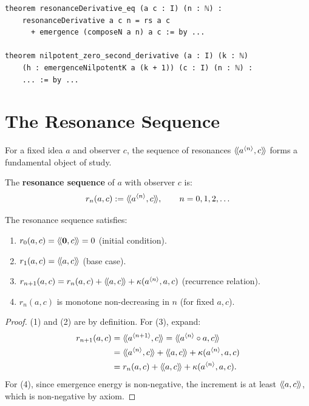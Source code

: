 \begin{lstlisting}[caption={Resonance derivative (IDT\_v3\_Emergence.lean)}]
theorem resonanceDerivative_eq (a c : I) (n : ℕ) :
    resonanceDerivative a c n = rs a c
      + emergence (composeN a n) a c := by ...

theorem nilpotent_zero_second_derivative (a : I) (k : ℕ)
    (h : emergenceNilpotentK a (k + 1)) (c : I) (n : ℕ) :
    ... := by ...
\end{lstlisting}


\section{The Resonance Sequence}

For a fixed idea $a$ and observer $c$, the sequence of resonances $\langle\!\langle a^{\langle n \rangle}, c \rangle\!\rangle$
forms a fundamental object of study.

\begin{definition}
\label{def:resonance-seq}
The \textbf{resonance sequence} of $a$ with observer $c$ is:
\[
  r_n(a,c) := \langle\!\langle a^{\langle n \rangle}, c \rangle\!\rangle, \qquad n = 0, 1, 2, \ldots
\]
\end{definition}

\begin{theorem}
\label{thm:resonance-seq-properties}
The resonance sequence satisfies:
\begin{enumerate}
  \item $r_0(a,c) = \langle\!\langle \mathbf{0}, c \rangle\!\rangle = 0$ (initial condition).
  \item $r_1(a,c) = \langle\!\langle a, c \rangle\!\rangle$ (base case).
  \item $r_{n+1}(a,c) = r_n(a,c) + \langle\!\langle a, c \rangle\!\rangle + \kappa(a^{\langle n \rangle}, a, c)$
    (recurrence relation).
  \item $r_n(a,c)$ is monotone non-decreasing in $n$ (for fixed $a, c$).
\end{enumerate}
\end{theorem}

\begin{proof}
(1) and (2) are by definition. For (3), expand:
\begin{align*}
r_{n+1}(a,c) &= \rs{\compN{a}{n+1}}{c} = \rs{\compN{a}{n} \compose a}{c} \\
&= \rs{\compN{a}{n}}{c} + \rs{a}{c} + \emerge(\compN{a}{n}, a, c) \\
&= r_n(a,c) + \rs{a}{c} + \emerge(\compN{a}{n}, a, c).
\end{align*}
For (4), since emergence energy is non-negative, the increment is at least
$\langle\!\langle a, c \rangle\!\rangle$, which is non-negative by axiom.
\end{proof}

